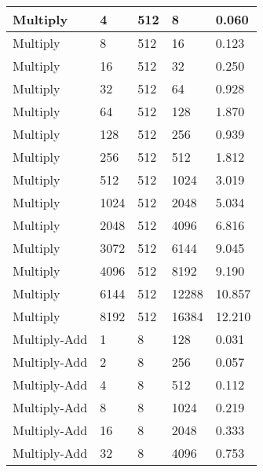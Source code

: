 \documentclass{article}
\begin{document}
\begin{longtable}{|l|l|l|l|l|}
Multiply           & 4    & 512         & 8                 & 0.060             \\ \hline
Multiply           & 8    & 512         & 16                & 0.123             \\ \hline
Multiply           & 16   & 512         & 32                & 0.250             \\ \hline
Multiply           & 32   & 512         & 64                & 0.928             \\ \hline
Multiply           & 64   & 512         & 128               & 1.870             \\ \hline
Multiply           & 128  & 512         & 256               & 0.939             \\ \hline
Multiply           & 256  & 512         & 512               & 1.812             \\ \hline
Multiply           & 512  & 512         & 1024              & 3.019             \\ \hline
Multiply           & 1024 & 512         & 2048              & 5.034             \\ \hline
Multiply           & 2048 & 512         & 4096              & 6.816             \\ \hline
Multiply           & 3072 & 512         & 6144              & 9.045             \\ \hline
Multiply           & 4096 & 512         & 8192              & 9.190             \\ \hline
Multiply           & 6144 & 512         & 12288             & 10.857            \\ \hline
Multiply           & 8192 & 512         & 16384             & 12.210            \\ \hline
Multiply-Add       & 1    & 8           & 128               & 0.031             \\ \hline
Multiply-Add       & 2    & 8           & 256               & 0.057             \\ \hline
Multiply-Add       & 4    & 8           & 512               & 0.112             \\ \hline
Multiply-Add       & 8    & 8           & 1024              & 0.219             \\ \hline
Multiply-Add       & 16   & 8           & 2048              & 0.333             \\ \hline
Multiply-Add       & 32   & 8           & 4096              & 0.753             \\ \hline

\end{longtable}
\end{document}
